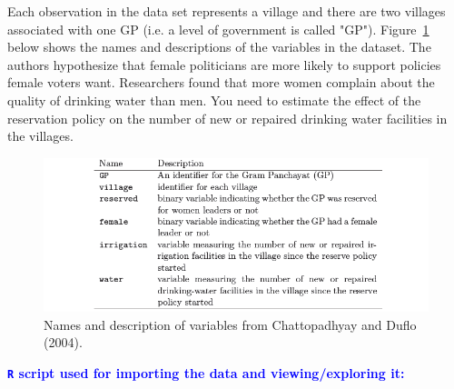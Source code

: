 \documentclass[12pt,letterpaper]{article}
\begin{document}
\noindent Each observation in the data set represents a village and there are two villages associated with one GP (i.e. a level of government is called "GP"). Figure~\ref{fig:women_desc} below shows the names and descriptions of the variables in the dataset. The authors hypothesize that female politicians are more likely to support policies female voters want. Researchers found that more women complain about the quality of drinking water than men. You need to estimate the effect of the reservation policy on the number of new or repaired drinking water facilities in the villages.
\vspace{.5cm}
\begin{figure}[h!]
	\caption{\footnotesize{Names and description of variables from Chattopadhyay and Duflo (2004).}}
	\vspace{.5cm}
	\centering
	\label{fig:women_desc}
	\includegraphics[width=1.1\textwidth]{women_desc.png}
\end{figure}		

\pagebreak

\textcolor{blue}{
	\noindent \textbf{\texttt{R} script used for importing the data and viewing/exploring it:}
}

  

\vspace{.25cm}
\end{document}
